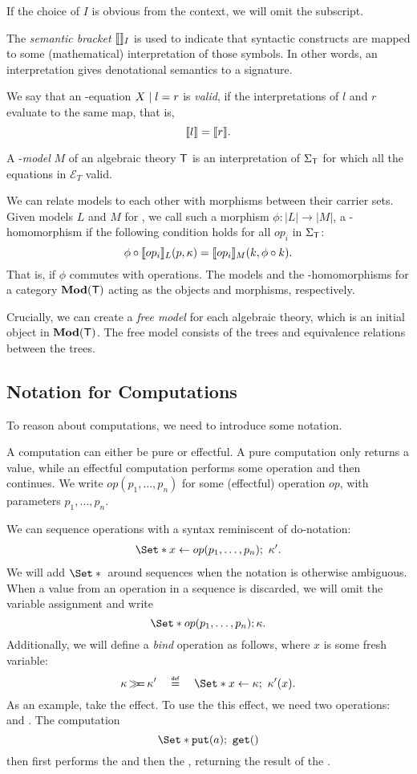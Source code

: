 If the choice of $I$ is obvious from the context, we will omit the subscript.

The \emph{semantic bracket} $\llbracket\rrbracket_I$ is used to indicate that syntactic constructs are mapped to some (mathematical) interpretation of those symbols. In other words, an interpretation gives denotational semantics to a signature.

\begin{definition}[Model]
    We say that an \Sig-equation $X \;|\; l = r$ is \emph{valid}, if the interpretations of $l$ and $r$ evaluate to the same map, that is,
    \[ \llbracket l\rrbracket = \llbracket r\rrbracket. \]

    A \T-\emph{model} $M$ of an algebraic theory $\mathsf{T}$ is an interpretation of $\Sigma_\mathsf{T}$ for which all the equations in $\mathcal{E}_T$ valid.
\end{definition}

We can relate models to each other with morphisms between their carrier sets. Given models $L$ and $M$ for \T, we call such a morphism $\phi : |L| \to |M|$, a \T-homomorphism if the following condition holds for all $op_i$ in $\Sigma_\mathsf{T}$:
\[ \phi \circ \llbracket op_i\rrbracket_L(p, \kappa) = \llbracket op_i\rrbracket_M(k, \phi \circ k). \]
That is, if $\phi$ commutes with operations. The models and the \T-homomorphisms for a category $\mathbf{Mod}(\mathsf{T})$ acting as the objects and morphisms, respectively.

Crucially, we can create a \emph{free model} for each algebraic theory, which is an initial object in $\mathbf{Mod}(\mathsf{T})$. The free model consists of the trees and equivalence relations between the trees.

\subsection{Notation for Computations}

To reason about computations, we need to introduce some notation.

A computation can either be pure or effectful. A pure computation only returns a value, while an effectful computation performs some operation and then continues. We write $op(p_1, \dots, p_n)$ for some (effectful) operation $op$, with parameters $p_1,\dots,p_n$.

We can sequence operations with a syntax reminiscent of do-notation:
\begin{align*}
    \S{x \gets op(p_1,\dots,p_n)\seq \kappa'}.
\end{align*}
We will add $\S{}$ around sequences when the notation is otherwise ambiguous. When a value from an operation in a sequence is discarded, we will omit the variable assignment and write 
\[ \S{op(p_1,\dots,p_n); \kappa}. \]
Additionally, we will define a \emph{bind} operation \bind as follows, where $x$ is some fresh variable:
\[ 
    \kappa \bind \kappa' \quad\defeq\quad \S{x \gets \kappa\seq \kappa'(x)}.
\]
As an example, take the  effect. To use the this effect, we need two operations:  and . The computation
\[ \S{\oput(a)\seq \oget()} \]
then first performs the \oput and then the \oget, returning the result of the \oget.

